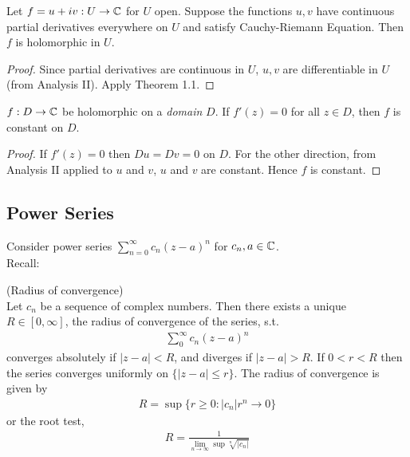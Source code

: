 \documentclass[a4paper]{article}
\begin{document}
\begin{coro}
Let $f=u+iv : U \to \mathbb{C}$ for $U$ open. Suppose the functions $u,v$ have continuous partial derivatives everywhere on $U$ and satisfy Cauchy-Riemann Equation. Then $f$ is holomorphic in $U$.
\begin{proof}
Since partial derivatives are continuous in $U$, $u,v$ are differentiable in $U$ (from Analysis II). Apply Theorem 1.1.
\end{proof} 
\end{coro}

\begin{coro}
$f: D \to \mathbb{C}$ be holomorphic on a \emph{domain} $D$. If $f'(z)=0$ for all $z \in D$, then $f$ is constant on $D$.
\begin{proof}
If $f'(z) = 0$ then $Du=Dv=0$ on $D$. For the other direction, from Analysis II applied to $u$ and $v$, $u$ and $v$ are constant. Hence $f$ is constant.
\end{proof}
\end{coro}

\subsection{Power Series}
Consider power series $\sum_{n=0}^\infty c_n(z-a)^n$ for $c_n,a \in \mathbb{C}$.\\
Recall:
\begin{thm} (Radius of convergence)\\
Let $c_n$ be a sequence of complex numbers. Then there exists a unique $R \in [0,\infty]$, the radius of convergence of the series, s.t.
\begin{equation*}
\begin{aligned}
\sum_0^\infty c_n (z-a)^n
\end{aligned}
\end{equation*}
converges absolutely if $|z-a|<R$, and diverges if $|z-a|>R$. If $0<r<R$ then the series converges uniformly on $\{|z-a|\leq r\}$. The radius of convergence is given by
\begin{equation*}
\begin{aligned}
R=\sup\{r\geq 0: |c_n|r^n \to 0\}
\end{aligned}
\end{equation*}
or the root test,
\begin{equation*}
\begin{aligned}
R=\frac{1}{\lim_{n \to \infty} \sup \sqrt[n]{|c_n|}}
\end{aligned}
\end{equation*}
\end{thm}
\end{document}
